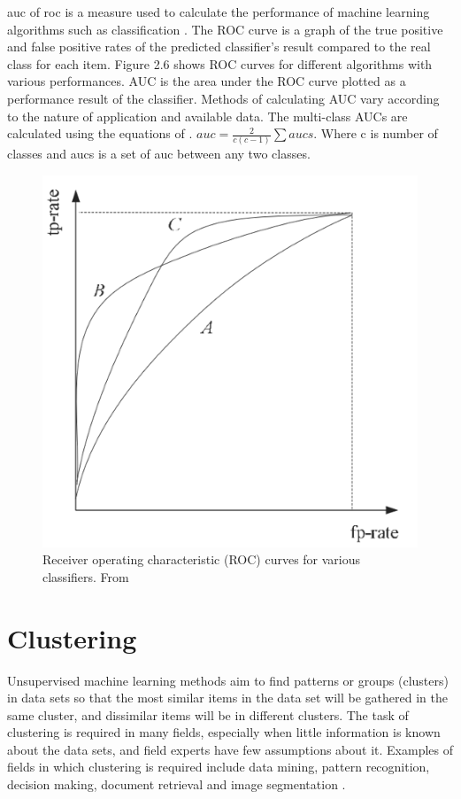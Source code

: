 \acrfull{auc} of \acrfull{roc} is a measure used to calculate the performance of machine learning algorithms such as classification \cite{Bradley1997} . The ROC curve is a graph of the true positive and false positive rates of the predicted classifier's result compared to the real class for each item. Figure 2.6 shows ROC curves for different algorithms with various performances. AUC is the area under the ROC curve plotted as a performance result of the classifier. Methods of calculating AUC vary according to the nature of application and available data. The multi-class AUCs are calculated using the equations of \cite{Hand2001}. $auc = \frac{2}{c(c-1)}\sum aucs$. Where c is number of classes and aucs is a set of auc between any two classes.

\begin{figure}[!h]
    
    \includegraphics[scale=0.4]{images/chapter2/AUC.png}
    \caption{Receiver operating characteristic (ROC) curves for various classifiers. From \cite{Dietterich2010}}
    \label{fig:ROC}
\end{figure}

\section{Clustering}

Unsupervised machine learning methods aim to find patterns or groups (clusters) in data sets so that the most similar items in the data set will be gathered in the same cluster, and dissimilar items will be in different clusters. The task of clustering is required in many fields, especially when little information is known about the data sets, and field experts have few assumptions about it. Examples of fields in which clustering is required include data mining, pattern recognition, decision making, document retrieval and image segmentation \cite{Jain1999}.

